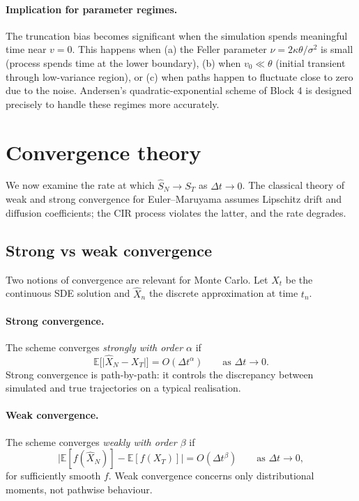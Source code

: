 \documentclass[11pt]{article}
\theoremstyle{plain}
\theoremstyle{definition}
\theoremstyle{remark}
\begin{document}
\paragraph{Implication for parameter regimes.} The truncation bias becomes significant when the simulation spends meaningful time near $v = 0$. This happens when (a) the Feller parameter $\nu = 2\kappa\theta/\sigma^2$ is small (process spends time at the lower boundary), (b) when $v_0 \ll \theta$ (initial transient through low-variance region), or (c) when paths happen to fluctuate close to zero due to the noise. Andersen's quadratic-exponential scheme of Block 4 is designed precisely to handle these regimes more accurately.

\section{Convergence theory}

We now examine the rate at which $\hat S_N \to S_T$ as $\Delta t \to 0$. The classical theory of weak and strong convergence for Euler--Maruyama assumes Lipschitz drift and diffusion coefficients; the CIR process violates the latter, and the rate degrades.

\subsection{Strong vs weak convergence}

Two notions of convergence are relevant for Monte Carlo. Let $X_t$ be the continuous SDE solution and $\hat X_n$ the discrete approximation at time $t_n$.

\paragraph{Strong convergence.} The scheme converges \emph{strongly with order $\alpha$} if
\[
    \mathbb{E}\bigl[\bigl|\hat X_N - X_T\bigr|\bigr] = O(\Delta t^\alpha) \qquad \text{as } \Delta t \to 0.
\]
Strong convergence is path-by-path: it controls the discrepancy between simulated and true trajectories on a typical realisation.

\paragraph{Weak convergence.} The scheme converges \emph{weakly with order $\beta$} if
\[
    \bigl|\mathbb{E}[f(\hat X_N)] - \mathbb{E}[f(X_T)]\bigr| = O(\Delta t^\beta) \qquad \text{as } \Delta t \to 0,
\]
for sufficiently smooth $f$. Weak convergence concerns only distributional moments, not pathwise behaviour.
\end{document}
